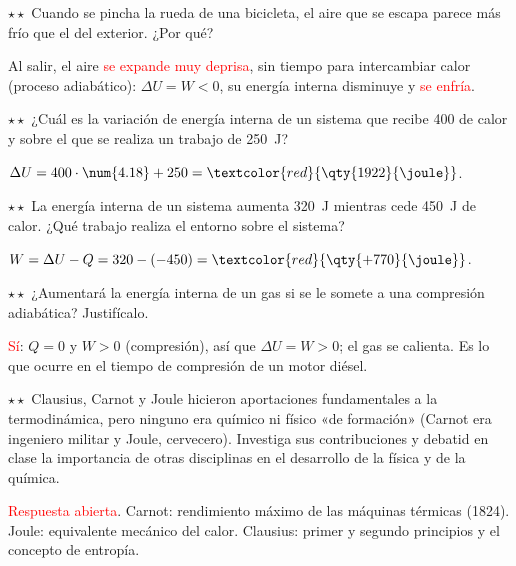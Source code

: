 \begin{exercise}
    \(\star\star\) Cuando se pincha la rueda de una bicicleta, el aire que se escapa parece más frío que el del exterior. ¿Por qué?
    \begin{solu}
        Al salir, el aire \textcolor{red}{se expande muy deprisa}, sin tiempo para intercambiar calor (proceso adiabático):
        \(\Delta U = W < 0\), su energía interna disminuye y \textcolor{red}{se enfría}.
    \end{solu}
\end{exercise}

\begin{exercise}
    \(\star\star\) ¿Cuál es la variación de energía interna de un sistema que recibe \qty{400}{\calorie} de calor y sobre el que se
    realiza un trabajo de \qty{250}{\joule}?
    \begin{solu}
        \(\Delta U = 400 \cdot \num{4.18} + 250 = \textcolor{red}{\qty{1922}{\joule}}\).
    \end{solu}
\end{exercise}

\begin{exercise}
    \(\star\star\) La energía interna de un sistema aumenta \qty{320}{\joule} mientras cede \qty{450}{\joule} de calor. ¿Qué trabajo
    realiza el entorno sobre el sistema?
    \begin{solu}
        \(W = \Delta U - Q = 320 - (-450) = \textcolor{red}{\qty{+770}{\joule}}\).
    \end{solu}
\end{exercise}

\begin{exercise}
    \(\star\star\) ¿Aumentará la energía interna de un gas si se le somete a una compresión adiabática? Justifícalo.
    \begin{solu}
        \textcolor{red}{Sí}: \(Q = 0\) y \(W > 0\) (compresión), así que \(\Delta U = W > 0\); el gas se calienta. Es lo que ocurre
        en el tiempo de compresión de un motor diésel.
    \end{solu}
\end{exercise}

\begin{exercise}
    \(\star\star\) Clausius, Carnot y Joule hicieron aportaciones fundamentales a la termodinámica, pero ninguno era químico ni físico
    «de formación» (Carnot era ingeniero militar y Joule, cervecero). Investiga sus contribuciones y debatid en clase la importancia
    de otras disciplinas en el desarrollo de la física y de la química.
    \begin{solu}
        \textcolor{red}{Respuesta abierta}. Carnot: rendimiento máximo de las máquinas térmicas (1824). Joule: equivalente mecánico
        del calor. Clausius: primer y segundo principios y el concepto de entropía.
    \end{solu}
\end{exercise}

